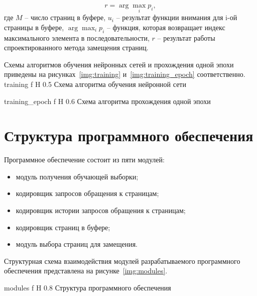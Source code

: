 \begin{equation}\label{formula:evict_3}
	r = \arg\max_{i} p_i,
\end{equation}
где $M$ -- число страниц в буфере, $u_i$ -- результат функции внимания для i-ой страницы в буфере, $\arg\max_{i} p_i$ -- функция, которая возвращает индекс максимального элемента в последовательности, $r$ -- результат работы спроектированного метода замещения страниц.

Схемы алгоритмов обучения нейронных сетей и прохождения одной эпохи приведены на рисунках~\ref{img:training} и~\ref{img:training_epoch} соответственно.
{training} %
{f} %
{H} %
{0.5\textwidth} %
{Схема алгоритма обучения нейронной сети} %

{training_epoch} %
{f} %
{H} %
{0.6\textwidth} %
{Схема алгоритма прохождения одной эпохи} %

\section{Структура программного обеспечения}

Программное обеспечение состоит из пяти модулей:
\begin{itemize}
	\item модуль получения обучающей выборки;
	\item кодировщик запросов обращения к страницам;
	\item кодировщик истории запросов обращения к страницам;
	\item кодировщик страниц в буфере;
	\item модуль выбора страниц для замещения.
\end{itemize}

Структурная схема взаимодействия модулей разрабатываемого программного обеспечения представлена на рисунке~\ref{img:modules}.

{modules} %
{f} %
{H} %
{0.8\textwidth} %
{Структура программного обеспечения} %


